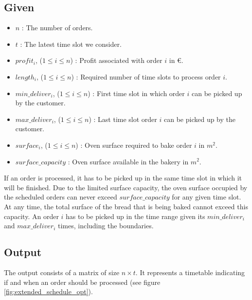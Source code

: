 \documentclass{article}
\begin{document}
\subsection*{Given}
\begin{itemize}
    \item $n$ : The number of orders.
    \item $t$ : The latest time slot we consider.
    \item $profit_i$, ($1\leq i \leq n$) : Profit associated with order $i$ in \euro{}.
    \item $length_i$, ($1\leq i \leq n$) : Required number of time slots to process order $i$.
    \item $min\_deliver_i$, ($1\leq i \leq n$) : First time slot in which order $i$ can be picked up by the customer.
    \item $max\_deliver_i$, ($1\leq i \leq n$) : Last time slot order $i$ can be picked up by the customer.
    \item $surface_i$, ($1\leq i \leq n$) : Oven surface required to bake order $i$ in $m^2$.
    \item $surface\_capacity$ : Oven surface available in the bakery in $m^2$.
\end{itemize}
If an order is processed, it has to be picked up in the same time slot in which it will be finished.
Due to the limited surface capacity, the oven surface occupied by the scheduled orders can never exceed $surface\_capacity$ for any given time slot. 
At any time, the total surface of the bread that is being baked cannot exceed this capacity.
An order $i$ has to be picked up in the time range given its $min\_deliver_i$ and $max\_deliver_i$ times, including the boundaries.

\subsection*{Output}
The output consists of a matrix of size $n \times t$.
It represents a timetable indicating if and when an order should be processed (see figure \ref{fig:extended_schedule_opt}). 
\end{document}
